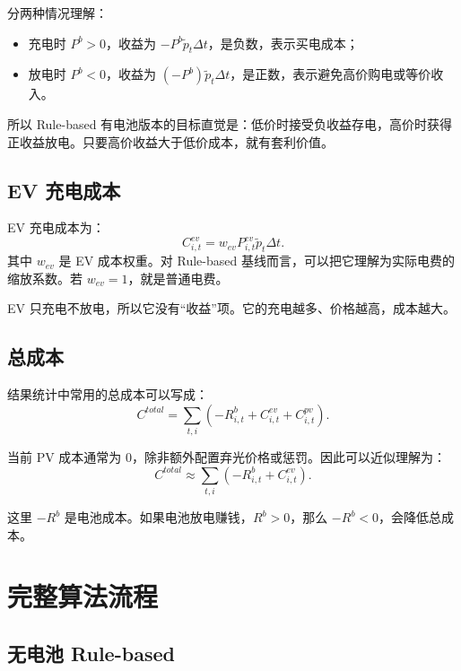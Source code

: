\documentclass[UTF8,zihao=-4]{ctexart}
\begin{document}
分两种情况理解：
\begin{itemize}
  \item 充电时 $P^b>0$，收益为 $-P^b\tilde p_t\Delta t$，是负数，表示买电成本；
  \item 放电时 $P^b<0$，收益为 $(-P^b)\tilde p_t\Delta t$，是正数，表示避免高价购电或等价收入。
\end{itemize}

所以 Rule-based 有电池版本的目标直觉是：低价时接受负收益存电，高价时获得正收益放电。只要高价收益大于低价成本，就有套利价值。

\subsection{EV 充电成本}

EV 充电成本为：
\begin{equation}
C^{ev}_{i,t}
=w_{ev}P^{ev}_{i,t}\tilde p_t\Delta t.
\end{equation}
其中 $w_{ev}$ 是 EV 成本权重。对 Rule-based 基线而言，可以把它理解为实际电费的缩放系数。若 $w_{ev}=1$，就是普通电费。

EV 只充电不放电，所以它没有“收益”项。它的充电越多、价格越高，成本越大。

\subsection{总成本}

结果统计中常用的总成本可以写成：
\begin{equation}
C^{total}
=\sum_{t,i}
\left(
-R^b_{i,t}+C^{ev}_{i,t}+C^{pv}_{i,t}
\right).
\end{equation}

当前 PV 成本通常为 0，除非额外配置弃光价格或惩罚。因此可以近似理解为：
\begin{equation}
C^{total}\approx
\sum_{t,i}
\left(
-R^b_{i,t}+C^{ev}_{i,t}
\right).
\end{equation}

这里 $-R^b$ 是电池成本。如果电池放电赚钱，$R^b>0$，那么 $-R^b<0$，会降低总成本。

\section{完整算法流程}

\subsection{无电池 Rule-based}
\end{document}
